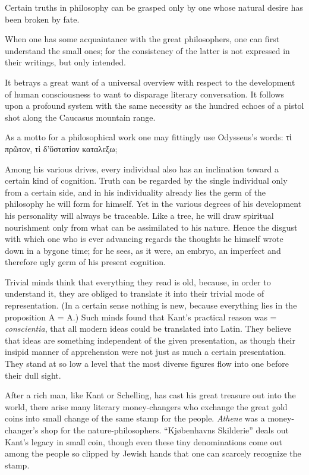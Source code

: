 \documentclass[12pt,a4paper]{article}
\newcommand{\opage}[1]{\marginnote{\footnotesize\textit{[#1]}}}
\newcommand{\aphsep}{\par\smallskip\centerline{\textasteriskcentered}\smallskip}
\begin{document}
\aphsep

Certain truths in philosophy can be grasped only by one whose natural desire has
been broken by fate.

\aphsep

When one has some acquaintance with the great philosophers, one can first
understand the small ones; for the consistency of the latter is not expressed in
their writings, but only intended.

\aphsep

It betrays a great want of a universal overview with respect to the development
of human consciousness to want to disparage literary conversation. It follows
upon a profound system with the same necessity as the hundred echoes of a pistol
shot along the Caucasus mountain range.

\aphsep

As a motto for a philosophical work one may fittingly use Odysseus's words:
τἱ πρῶτον, τἱ δ'ὕστατἱον καταλεξω;

\aphsep

Among his various drives, every individual also has an inclination toward a
certain kind of cognition. Truth can be regarded by the single individual only
from a certain side, and in his individuality already lies the germ of the
philosophy he will form for himself. Yet in \opage{19}the various degrees of his
development his personality will always be traceable. Like a tree, he will draw
spiritual nourishment only from what can be assimilated to his nature. Hence the
disgust with which one who is ever advancing regards the thoughts he himself
wrote down in a bygone time; for he sees, as it were, an embryo, an imperfect and
therefore ugly germ of his present cognition.

\aphsep

Trivial minds think that everything they read is old, because, in order to
understand it, they are obliged to translate it into their trivial mode of
representation. (In a certain sense nothing is new, because everything lies in
the proposition A = A.) Such minds found that Kant's practical reason was =
\textit{conscientia}, that all modern ideas could be translated into Latin. They
believe that ideas are something independent of the given presentation, as though
their insipid manner of apprehension were not just as much a certain
presentation. They stand at so low a level that the most diverse figures flow
into one before their dull sight.

\aphsep

After a rich man, like Kant or Schelling, has cast his great treasure out into
the world, there arise many literary money-changers who exchange the great gold
coins into small change of the same stamp for the people. \textit{Athene} was a
money-changer's shop for the nature-philosophers. ``Kjøbenhavns Skilderie'' deals
out Kant's legacy in small coin, though even these tiny denominations come out
among the people so clipped by Jewish hands that one can scarcely recognize the
stamp.
\end{document}

